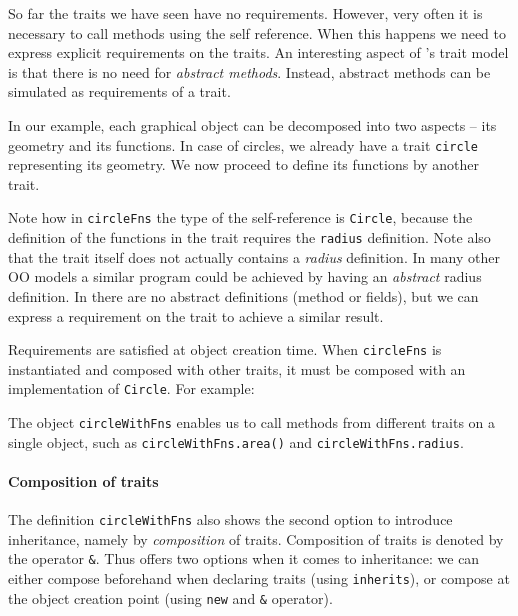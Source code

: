 So far the traits we have seen have no requirements. However, very often it is
necessary to call methods using the self reference. When this happens
we need to express explicit requirements on the traits. An interesting aspect
of \name's trait model is that there is no need for \emph{abstract
  methods}. Instead, abstract methods can be simulated as requirements 
of a trait. 

In our example, each graphical object can be decomposed into two aspects -- its
geometry and its functions. In case of circles, we already have a trait
\lstinline{circle} representing its geometry. We now proceed to define its
functions by another trait.

\noindent Note how in \lstinline$circleFns$ the type of the self-reference is
\lstinline$Circle$, because the definition of the functions in the
trait requires the \lstinline{radius} definition. Note also that
the trait itself does not actually contains a \emph{radius}
definition. In many other OO models a similar program could be achieved
by having an \emph{abstract} radius definition. In \name there are no
abstract definitions (method or fields), but we can express a
requirement on the trait to achieve a similar result. 

Requirements are satisfied at object creation time. When \lstinline$circleFns$
is instantiated and composed with other traits, it must be composed with an
implementation of \lstinline$Circle$. For example:

The object \lstinline{circleWithFns} enables us to call
methods from different traits on a single object, such as
\lstinline{circleWithFns.area()} and \lstinline{circleWithFns.radius}.

\paragraph{Composition of traits}
The definition \lstinline{circleWithFns} also shows the second option to
introduce inheritance, namely by \textit{composition} of traits. Composition of
traits is denoted by the operator \lstinline{&}. Thus \name offers two options
when it comes to inheritance: we can either compose beforehand when declaring
traits (using \lstinline{inherits}), or compose at the object creation point
(using \lstinline{new} and \lstinline{&} operator).

